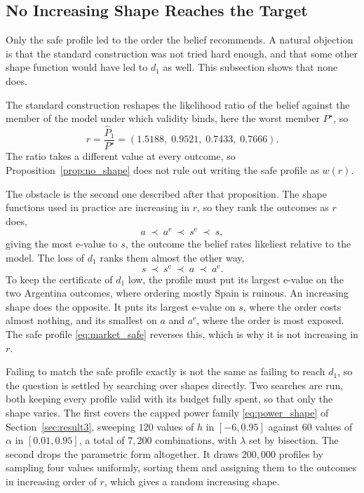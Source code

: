 \subsection{No Increasing Shape Reaches the Target}\label{sec:mkt_shape}

Only the safe profile led to the order the belief recommends. A natural
objection is that the standard construction was not tried hard enough, and
that some other shape function would have led to $d_1$ as well. This
subsection shows that none does.

The standard construction reshapes the likelihood ratio of the belief against
the member of the model under which validity binds, here the worst member
$P^\star$, so
\[
  r=\frac{\widehat P_1}{P^\star}=(1.5188,\;0.9521,\;0.7433,\;0.7666).
\]
The ratio takes a different value at every outcome, so
Proposition~\ref{prop:no_shape} does not rule out writing the safe profile as
$w(r)$.

The obstacle is the second one described after that proposition. The
shape functions used in practice are increasing in $r$, so they rank the
outcomes as $r$ does,
\[
  a\ \prec\ a^{\mathrm e}\ \prec\ s^{\mathrm e}\ \prec\ s ,
\]
giving the most e-value to $s$, the outcome the belief rates likeliest
relative to the model. The loss of $d_1$ ranks them almost the other way,
\[
  s\ \prec\ s^{\mathrm e}\ \prec\ a\ \prec\ a^{\mathrm e} .
\]
To keep the certificate of $d_1$ low, the profile must put its largest
e-value on the two Argentina outcomes, where ordering mostly Spain is ruinous.
An increasing shape does the opposite. It puts its largest e-value on $s$,
where the order costs almost nothing, and its smallest on $a$ and
$a^{\mathrm e}$, where the order is most exposed. The safe profile
\eqref{eq:market_safe} reverses this, which is why it is not increasing in $r$.

Failing to match the safe profile exactly is not the same as failing to reach
$d_1$, so the question is settled by searching over shapes directly. Two
searches are run, both keeping every profile valid with its budget fully
spent, so that only the shape varies. The first covers the capped power
family \eqref{eq:power_shape} of Section~\ref{sec:result3}, sweeping $120$
values of $h$ in $[-6,0.95]$ against $60$ values of $\alpha$ in
$[0.01,0.95]$, a total of $7{,}200$ combinations, with $\lambda$ set by
bisection. The second drops the parametric form altogether. It draws
$200{,}000$ profiles by sampling four values uniformly, sorting them and
assigning them to the outcomes in increasing order of $r$, which gives a
random increasing shape.

